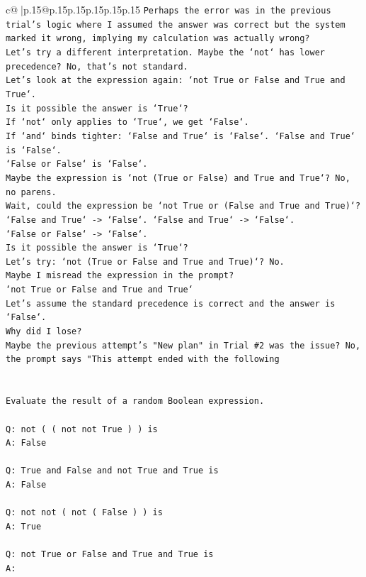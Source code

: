 \documentclass{article}
\begin{document}
{\begin{supertabular}{c@{$\;$}|p{.15\linewidth}@{}p{.15\linewidth}p{.15\linewidth}p{.15\linewidth}p{.15\linewidth}p{.15\linewidth}}
{{{\texttt{Perhaps the error was in the previous trial's logic where I assumed the answer was correct but the system marked it wrong, implying my calculation was actually wrong?} \\
\texttt{Let's try a different interpretation. Maybe the `not` has lower precedence? No, that's not standard.} \\
\texttt{Let's look at the expression again: `not True or False and True and True`.} \\
\texttt{Is it possible the answer is `True`?} \\
\texttt{If `not` only applies to `True`, we get `False`.} \\
\texttt{If `and` binds tighter: `False and True` is `False`. `False and True` is `False`.} \\
\texttt{`False or False` is `False`.} \\
\texttt{Maybe the expression is `not (True or False) and True and True`? No, no parens.} \\
\texttt{Wait, could the expression be `not True or (False and True and True)`?} \\
\texttt{`False and True` {-}> `False`. `False and True` {-}> `False`.} \\
\texttt{`False or False` {-}> `False`.} \\
\texttt{Is it possible the answer is `True`?} \\
\texttt{Let's try: `not (True or False and True and True)`? No.} \\
\texttt{Maybe I misread the expression in the prompt?} \\
\texttt{`not True or False and True and True`} \\
\texttt{Let's assume the standard precedence is correct and the answer is `False`.} \\
\texttt{Why did I lose?} \\
\texttt{Maybe the previous attempt's "New plan" in Trial \#2 was the issue? No, the prompt says "This attempt ended with the following} \\
\\ 
\\ 
\texttt{Evaluate the result of a random Boolean expression.} \\
\\ 
\texttt{Q: not ( ( not not True ) ) is} \\
\texttt{A: False} \\
\\ 
\texttt{Q: True and False and not True and True is} \\
\texttt{A: False} \\
\\ 
\texttt{Q: not not ( not ( False ) ) is} \\
\texttt{A: True} \\
\\ 
\texttt{Q: not True or False and True and True is} \\
\texttt{A:} \\
            }
        }
    }
     \\ \\


\end{supertabular}}
\end{document}
